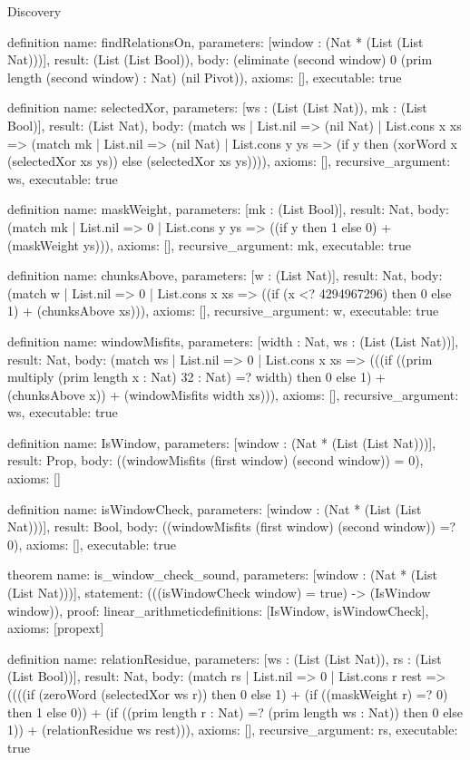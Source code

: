\begin{lexlean}{Discovery}
\begin{semanticmodule}
definition{
  name: findRelationsOn,
  parameters: [window : (Nat * (List (List Nat)))],
  result: (List (List Bool)),
  body: (eliminate (second window) 0 (prim length (second window) : Nat) (nil Pivot)),
  axioms: [],
  executable: true
}

definition{
  name: selectedXor,
  parameters: [ws : (List (List Nat)), mk : (List Bool)],
  result: (List Nat),
  body: (match ws
    | List.nil => (nil Nat)
    | List.cons x xs => (match mk
    | List.nil => (nil Nat)
    | List.cons y ys => (if y then (xorWord x (selectedXor xs ys)) else (selectedXor xs ys)))),
  axioms: [],
  recursive_argument: ws,
  executable: true
}

definition{
  name: maskWeight,
  parameters: [mk : (List Bool)],
  result: Nat,
  body: (match mk
    | List.nil => 0
    | List.cons y ys => ((if y then 1 else 0) + (maskWeight ys))),
  axioms: [],
  recursive_argument: mk,
  executable: true
}

definition{
  name: chunksAbove,
  parameters: [w : (List Nat)],
  result: Nat,
  body: (match w
    | List.nil => 0
    | List.cons x xs => ((if (x <? 4294967296) then 0 else 1) + (chunksAbove xs))),
  axioms: [],
  recursive_argument: w,
  executable: true
}

definition{
  name: windowMisfits,
  parameters: [width : Nat, ws : (List (List Nat))],
  result: Nat,
  body: (match ws
    | List.nil => 0
    | List.cons x xs => (((if ((prim multiply (prim length x : Nat) 32 : Nat) =? width) then 0 else 1) + (chunksAbove x)) + (windowMisfits width xs))),
  axioms: [],
  recursive_argument: ws,
  executable: true
}

definition{
  name: IsWindow,
  parameters: [window : (Nat * (List (List Nat)))],
  result: Prop,
  body: ((windowMisfits (first window) (second window)) = 0),
  axioms: []
}

definition{
  name: isWindowCheck,
  parameters: [window : (Nat * (List (List Nat)))],
  result: Bool,
  body: ((windowMisfits (first window) (second window)) =? 0),
  axioms: [],
  executable: true
}

theorem{
  name: is_window_check_sound,
  parameters: [window : (Nat * (List (List Nat)))],
  statement: (((isWindowCheck window) = true) -> (IsWindow window)),
  proof: linear_arithmetic{definitions: [IsWindow, isWindowCheck]},
  axioms: [propext]
}

definition{
  name: relationResidue,
  parameters: [ws : (List (List Nat)), rs : (List (List Bool))],
  result: Nat,
  body: (match rs
    | List.nil => 0
    | List.cons r rest => ((((if (zeroWord (selectedXor ws r)) then 0 else 1) + (if ((maskWeight r) =? 0) then 1 else 0)) + (if ((prim length r : Nat) =? (prim length ws : Nat)) then 0 else 1)) + (relationResidue ws rest))),
  axioms: [],
  recursive_argument: rs,
  executable: true
}


\end{semanticmodule}
\end{lexlean}
